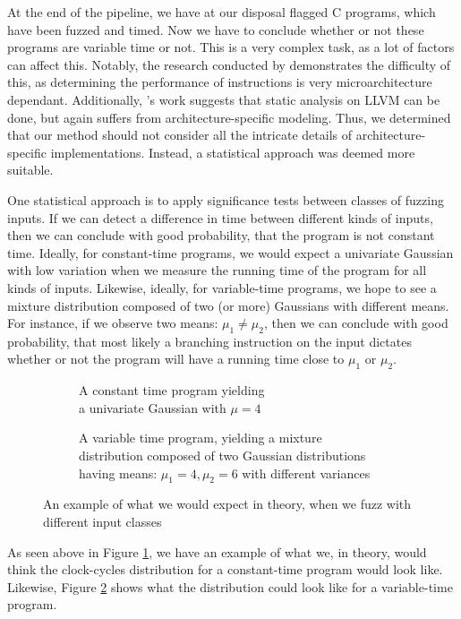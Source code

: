 \label{sec:statistical-analysis}
At the end of the pipeline, we have at our disposal flagged C programs, which have been fuzzed and timed. Now we have to conclude whether or not these programs are variable time or not. This is a very complex task, as a lot of factors can affect this. Notably, the research conducted by \citeauthor{Abel19a} demonstrates the difficulty of this, as determining the performance of instructions is very microarchitecture dependant. Additionally, \cite{Almeida16}'s work suggests that static analysis on LLVM can be done, but again suffers from architecture-specific modeling. Thus, we determined that our method should not consider all the intricate details of architecture-specific implementations. Instead, a statistical approach was deemed more suitable.

One statistical approach is to apply significance tests between classes of fuzzing inputs. If we can detect a difference in time between different kinds of inputs, then we can conclude with good probability, that the program is not constant time. Ideally, for constant-time programs, we would expect a univariate Gaussian with low variation when we measure the running time of the program for all kinds of inputs. Likewise, ideally, for variable-time programs, we hope to see a mixture distribution composed of two (or more) Gaussians with different means. For instance, if we observe two means: $\mu_1 \neq \mu_2$, then we can conclude with good probability, that most likely a branching instruction on the input dictates whether or not the program will have a running time close to $\mu_1$ or $\mu_2$.


\def\gausssolution{5.170045172}
\begin{figure}[H]
\captionsetup[subfigure]{justification=centering}
\begin{subfigure}[t]{0.50\textwidth}
\resizebox{\linewidth}{!}{
    
}%
\caption{A constant time program yielding\\a univariate Gaussian with $\mu = 4$}
\label{fig:univargauss}
\end{subfigure}
\begin{subfigure}[t]{0.50\textwidth}
\resizebox{\linewidth}{!}{
    
}%
\caption{A variable time program, yielding a mixture\\distribution composed of two Gaussian distributions\\having means: $\mu_1 = 4, \mu_2 = 6$ with different variances}
\label{fig:mixdisgauss}
\end{subfigure}
\caption{An example of what we would expect in theory, when we fuzz with different input classes}
\label{fig:fuzzclass-statistics-example}
\end{figure}
As seen above in Figure \ref{fig:univargauss}, we have an example of what we, in theory, would think the clock-cycles distribution for a constant-time program would look like. Likewise, Figure \ref{fig:mixdisgauss} shows what the distribution could look like for a variable-time program.


